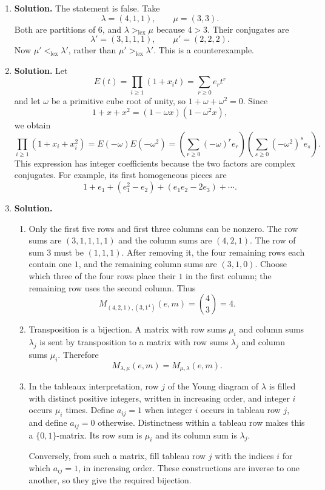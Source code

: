 \documentclass{article}
\begin{document}
\begin{enumerate}
\item \textbf{Solution.}
The statement is false.  Take
\[
\lambda=(4,1,1),\qquad \mu=(3,3).
\]
Both are partitions of $6$, and $\lambda>_{\mathrm{lex}}\mu$ because
$4>3$.  Their conjugates are
\[
\lambda'=(3,1,1,1),\qquad \mu'=(2,2,2).
\]
Now $\mu'<_{\mathrm{lex}}\lambda'$, rather than
$\mu'>_{\mathrm{lex}}\lambda'$.  This is a counterexample.

\item \textbf{Solution.}
Let
\[
E(t)=\prod_{i\geq1}(1+x_it)=\sum_{r\geq0}e_rt^r
\]
and let $\omega$ be a primitive cube root of unity, so
$1+\omega+\omega^2=0$.  Since
\[
1+x+x^2=(1-\omega x)(1-\omega^2x),
\]
we obtain
\[
\boxed{\prod_{i\geq1}(1+x_i+x_i^2)
=E(-\omega)E(-\omega^2)
=\left(\sum_{r\geq0}(-\omega)^re_r\right)
 \left(\sum_{s\geq0}(-\omega^2)^se_s\right).}
\]
This expression has integer coefficients because the two factors are
complex conjugates.  For example, its first homogeneous pieces are
\[
1+e_1+(e_1^2-e_2)+(e_1e_2-2e_3)+\cdots.
\]

\item \textbf{Solution.}
\begin{enumerate}
\item Only the first five rows and first three columns can be nonzero.
The row sums are $(3,1,1,1,1)$ and the column sums are $(4,2,1)$.
The row of sum $3$ must be $(1,1,1)$.  After removing it, the four
remaining rows each contain one $1$, and the remaining column sums are
$(3,1,0)$.  Choose which three of the four rows place their $1$ in the
first column; the remaining row uses the second column.  Thus
\[
\boxed{M_{(4,2,1),(3,1^4)}(e,m)=\binom43=4.}
\]

\item Transposition is a bijection.  A matrix with row sums $\mu_i$
and column sums $\lambda_j$ is sent by transposition to a matrix with
row sums $\lambda_j$ and column sums $\mu_i$.  Therefore
\[
\boxed{M_{\lambda,\mu}(e,m)=M_{\mu,\lambda}(e,m).}
\]

\item In the tableaux interpretation, row $j$ of the Young diagram of
$\lambda$ is filled with distinct positive integers, written in
increasing order, and integer $i$ occurs $\mu_i$ times.  Define
$a_{ij}=1$ when integer $i$ occurs in tableau row $j$, and define
$a_{ij}=0$ otherwise.  Distinctness within a tableau row makes this a
$\{0,1\}$-matrix.  Its row sum is $\mu_i$ and its column sum is
$\lambda_j$.

Conversely, from such a matrix, fill tableau row $j$ with the indices
$i$ for which $a_{ij}=1$, in increasing order.  These constructions
are inverse to one another, so they give the required bijection.
\end{enumerate}


\end{enumerate}
\end{document}
